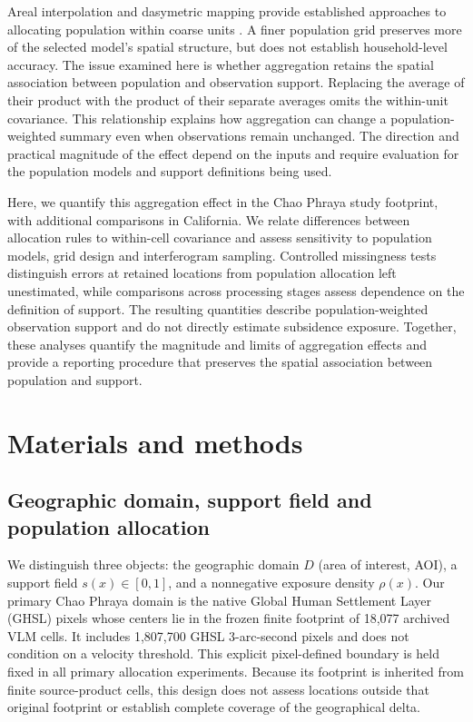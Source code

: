 \documentclass[pdflatex,sn-nature]{sn-jnl}
\begin{document}
Areal interpolation and dasymetric mapping provide established approaches to allocating population within coarse units \citep{eicher2001dasymetric,mennis2003population}. A finer population grid preserves more of the selected model's spatial structure, but does not establish household-level accuracy. The issue examined here is whether aggregation retains the spatial association between population and observation support. Replacing the average of their product with the product of their separate averages omits the within-unit covariance. This relationship explains how aggregation can change a population-weighted summary even when observations remain unchanged. The direction and practical magnitude of the effect depend on the inputs and require evaluation for the population models and support definitions being used.

Here, we quantify this aggregation effect in the Chao Phraya study footprint, with additional comparisons in California. We relate differences between allocation rules to within-cell covariance and assess sensitivity to population models, grid design and interferogram sampling. Controlled missingness tests distinguish errors at retained locations from population allocation left unestimated, while comparisons across processing stages assess dependence on the definition of support. The resulting quantities describe population-weighted observation support and do not directly estimate subsidence exposure. Together, these analyses quantify the magnitude and limits of aggregation effects and provide a reporting procedure that preserves the spatial association between population and support.

\section{Materials and methods}
\subsection{Geographic domain, support field and population allocation}
We distinguish three objects: the geographic domain $D$ (area of interest, AOI), a support field $s(x)\in[0,1]$, and a nonnegative exposure density $\rho(x)$. Our primary Chao Phraya domain is the native Global Human Settlement Layer (GHSL) pixels whose centers lie in the frozen finite footprint of 18,077 archived VLM cells. It includes 1,807,700 GHSL 3-arc-second pixels and does not condition on a velocity threshold. This explicit pixel-defined boundary is held fixed in all primary allocation experiments. Because its footprint is inherited from finite source-product cells, this design does not assess locations outside that original footprint or establish complete coverage of the geographical delta.
\end{document}
